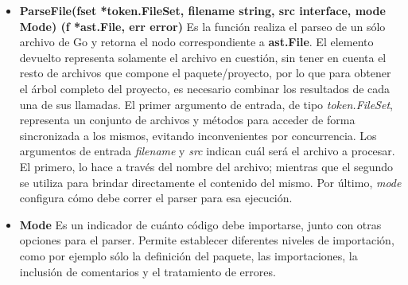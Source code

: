 \begin{itemize}
  \begin{itemize}
    \item \textbf{ParseFile(fset *token.FileSet, filename string, src interface{}, mode Mode) (f *ast.File, err error)} Es la función realiza el parseo de un sólo archivo de Go y retorna el nodo correspondiente a \textbf{ast.File}.
    El elemento devuelto representa solamente el archivo en cuestión, sin tener en cuenta el resto de archivos que compone el paquete/proyecto, por lo que para obtener el árbol completo del proyecto, es necesario combinar los resultados de cada una de sus llamadas.
    El primer argumento de entrada, de tipo \textit{token.FileSet}, representa un conjunto de archivos y métodos para acceder de forma sincronizada a los mismos, evitando inconvenientes por concurrencia.
    Los argumentos de entrada \textit{filename} y \textit{src} indican cuál será el archivo a procesar.
    El primero, lo hace a través del nombre del archivo; mientras que el segundo se utiliza para brindar directamente el contenido del mismo.
    Por último, \textit{mode} configura cómo debe correr el parser para esa ejecución.

    \item \textbf{Mode} Es un indicador de cuánto código debe importarse, junto con otras opciones para el parser.
    Permite establecer diferentes niveles de importación, como por ejemplo sólo la definición del paquete, las importaciones, la inclusión de comentarios y el tratamiento de errores.
    
  \end{itemize}
  
\end{itemize}
